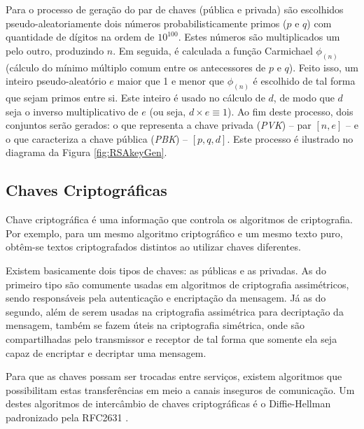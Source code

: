 \documentclass[12pt]{article}
\begin{document}
                Para o processo de geração do par de chaves (pública e privada) são escolhidos pseudo-aleatoriamente dois números probabilisticamente primos ($p$ e $q$) com quantidade de dígitos na ordem de $10^{100}$. Estes números são multiplicados um pelo outro, produzindo $n$. Em seguida, é calculada a função Carmichael $\phi_{(n)}$ (cálculo do mínimo múltiplo comum entre os antecessores de $p$ e $q$). Feito isso, um inteiro pseudo-aleatório $e$ maior que 1 e menor que $\phi_{(n)}$ é escolhido de tal forma que sejam primos entre si. Este inteiro é usado no cálculo de $d$, de modo que $d$ seja o inverso multiplicativo de $e$ (ou seja, $d \times e \equiv 1$). Ao fim deste processo, dois conjuntos serão gerados: o que representa a chave privada (\textit{PVK}) -- par $[n, e]$ -- e o que caracteriza a chave pública (\textit{PBK}) -- $[p, q, d]$. Este processo é ilustrado no diagrama da Figura \ref{fig:RSAkeyGen}.
                
                
        
        \subsection{Chaves Criptográficas}
        \label{subsec:chaves_criptograficas}
            
            Chave criptográfica é uma informação que controla os algoritmos de criptografia. Por exemplo, para um mesmo algoritmo criptográfico e um mesmo texto puro, obtêm-se textos criptografados distintos ao utilizar chaves diferentes.
            
            Existem basicamente dois tipos de chaves: as públicas e as privadas. As do primeiro tipo são comumente usadas em algoritmos de criptografia assimétricos, sendo responsáveis pela autenticação e encriptação da mensagem. Já as do segundo, além de serem usadas na criptografia assimétrica para decriptação da mensagem, também se fazem úteis na criptografia simétrica, onde são compartilhadas pelo transmissor e receptor de tal forma que somente ela seja capaz de encriptar e decriptar uma mensagem.
            
            Para que as chaves possam ser trocadas entre serviços, existem algoritmos que possibilitam estas transferências em meio a canais inseguros de comunicação. Um destes algoritmos de intercâmbio de chaves criptográficas é o Diffie-Hellman padronizado pela RFC2631 \cite{rescorla1999diffie}.
            
\end{document}
